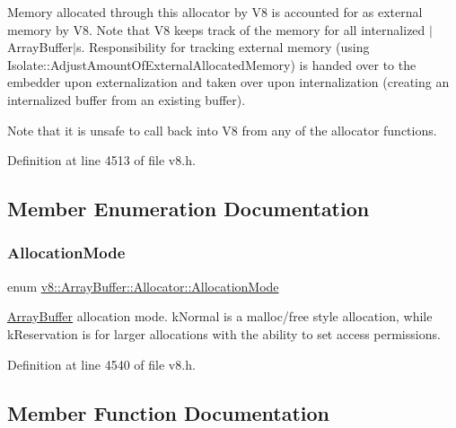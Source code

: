 Memory allocated through this allocator by V8 is accounted for as external memory by V8. Note that V8 keeps track of the memory for all internalized $\vert$\+Array\+Buffer$\vert$s. Responsibility for tracking external memory (using Isolate\+::\+Adjust\+Amount\+Of\+External\+Allocated\+Memory) is handed over to the embedder upon externalization and taken over upon internalization (creating an internalized buffer from an existing buffer).

Note that it is unsafe to call back into V8 from any of the allocator functions. 

Definition at line 4513 of file v8.\+h.



\subsection{Member Enumeration Documentation}
\mbox{\label{classv8_1_1ArrayBuffer_1_1Allocator_ab106d1fbad7be9f6fd8b0f5c550ac59e}} 
\subsubsection{\texorpdfstring{Allocation\+Mode}{AllocationMode}}
{\footnotesize\ttfamily enum \mbox{\hyperlink{classv8_1_1ArrayBuffer_1_1Allocator_ab106d1fbad7be9f6fd8b0f5c550ac59e}{v8\+::\+Array\+Buffer\+::\+Allocator\+::\+Allocation\+Mode}}\hspace{0.3cm}{\ttfamily [strong]}}

\mbox{\hyperlink{classv8_1_1ArrayBuffer}{Array\+Buffer}} allocation mode. k\+Normal is a malloc/free style allocation, while k\+Reservation is for larger allocations with the ability to set access permissions. 

Definition at line 4540 of file v8.\+h.



\subsection{Member Function Documentation}
\mbox{\label{classv8_1_1ArrayBuffer_1_1Allocator_a106b0d80120ed04fe9b9675e96f0340b}} 
